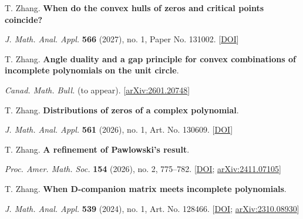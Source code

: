 \documentclass[11pt,letterpaper]{article}
\begin{document}
\begin{enumerate}[label={[\arabic*]},series=published]
\raggedright

\item \begin{minipage}[t]{\linewidth}\raggedright T. Zhang. \textbf{When do the convex hulls of zeros and critical points coincide?}\par \textit{J. Math. Anal. Appl.} \textbf{566} (2027), no. 1, Paper No. 131002. [\href{https://doi.org/10.1016/j.jmaa.2026.131002}{DOI}]\end{minipage}

\item \begin{minipage}[t]{\linewidth}\raggedright T. Zhang. \textbf{Angle duality and a gap principle for convex combinations of incomplete polynomials on the unit circle}.\par \textit{Canad. Math. Bull.} (to appear). [\href{https://arxiv.org/abs/2601.20748}{arXiv:2601.20748}]\end{minipage}

\item \begin{minipage}[t]{\linewidth}\raggedright T. Zhang. \textbf{Distributions of zeros of a complex polynomial}.\par \textit{J. Math. Anal. Appl.} \textbf{561} (2026), no. 1, Art. No. 130609. [\href{https://doi.org/10.1016/j.jmaa.2026.130609}{DOI}]\end{minipage}

\item \begin{minipage}[t]{\linewidth}\raggedright T. Zhang. \textbf{A refinement of Pawlowski's result}.\par \textit{Proc. Amer. Math. Soc.} \textbf{154} (2026), no. 2, 775--782. [\href{https://doi.org/10.1090/proc/17471}{DOI}; \href{https://arxiv.org/abs/2411.07105}{arXiv:2411.07105}]\end{minipage}

\item \begin{minipage}[t]{\linewidth}\raggedright T. Zhang. \textbf{When D-companion matrix meets incomplete polynomials}.\par \textit{J. Math. Anal. Appl.} \textbf{539} (2024), no. 1, Art. No. 128466. [\href{https://doi.org/10.1016/j.jmaa.2024.128466}{DOI}; \href{https://arxiv.org/abs/2310.08930}{arXiv:2310.08930}]\end{minipage}

\end{enumerate}
\end{document}
